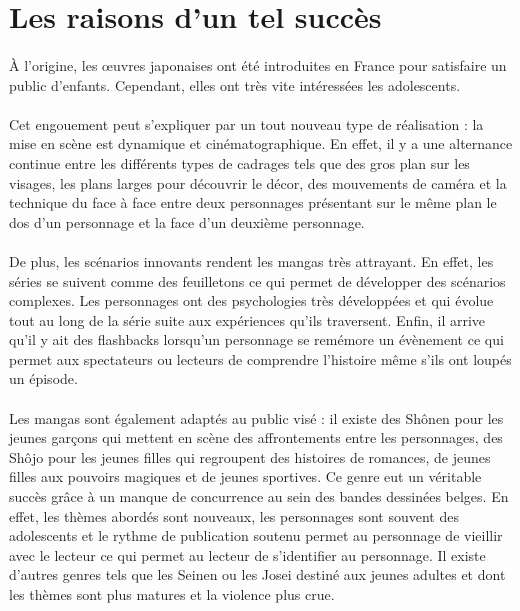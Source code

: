 \section{Les raisons d'un tel succès}

\paragraph{} À l'origine, les œuvres japonaises ont été introduites en France
pour satisfaire un public d'enfants. Cependant, elles ont très vite intéressées
les adolescents.

\paragraph{} Cet engouement peut s'expliquer par un tout nouveau type de
réalisation : la mise en scène est dynamique et cinématographique. En effet, il
y a une alternance continue entre les différents types de cadrages tels que des
gros plan sur les visages, les plans larges pour découvrir le décor, des
mouvements de caméra et la technique du face à face entre deux personnages
présentant sur le même plan le dos d'un personnage et la face d'un deuxième
personnage.

\paragraph{} De plus, les scénarios innovants rendent les mangas très
attrayant. En effet, les séries se suivent comme des feuilletons ce qui permet
de développer des scénarios complexes. Les personnages ont des psychologies
très développées et qui évolue tout au long de la série suite aux expériences
qu'ils traversent. Enfin, il arrive qu'il y ait des flashbacks lorsqu'un
personnage se remémore un évènement ce qui permet aux spectateurs ou lecteurs
de comprendre l'histoire même s'ils ont loupés un épisode.

\paragraph{} Les mangas sont également adaptés au public visé : il existe des
Shônen pour les jeunes garçons qui mettent en scène des affrontements entre les
personnages, des Shôjo pour les jeunes filles qui regroupent des histoires de
romances, de jeunes filles aux pouvoirs magiques et de jeunes sportives. Ce
genre eut un véritable succès grâce à un manque de concurrence au sein des
bandes dessinées belges. En effet, les thèmes abordés sont nouveaux, les
personnages sont souvent des adolescents et le rythme de publication soutenu
permet au personnage de vieillir avec le lecteur ce qui permet au lecteur de
s'identifier au personnage. Il existe d'autres genres tels que les Seinen ou
les Josei destiné aux jeunes adultes et dont les thèmes sont plus matures et la
violence plus crue.

